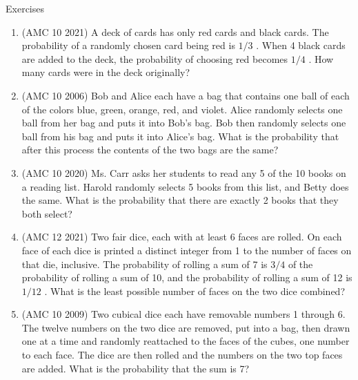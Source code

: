 \begin{xcb}{Exercises}
\begin{enumerate}
\begin{hint}
\end{hint}
\item(AMC 10 2021)  A deck of cards has only red cards and black cards. The probability of a randomly chosen card being red is $1/3$ . When 4 black cards are added to the deck, the probability of choosing red becomes $1/4$ . How many cards were in the deck originally?
\item(AMC 10 2006)  Bob and Alice each have a bag that contains one ball of each of the colors blue, green, orange, red, and violet. Alice randomly selects one ball from her bag and puts it into Bob’s bag. Bob then randomly selects one ball from his bag and puts it into Alice’s bag. What is the probability that after this process the contents of the two bags are the same?
\item(AMC 10 2020)  Ms. Carr asks her students to read any 5 of the 10 books on a reading list. Harold randomly selects 5 books from this list, and Betty does the same. What is the probability that there are exactly 2 books that they both select?
\begin{hint}
\end{hint}
\item (AMC 12 2021)  Two fair dice, each with at least 6 faces are rolled. On each face of each dice is printed a distinct integer from 1 to the number of faces on that die, inclusive. The probability of rolling a sum of 7 is $3/4$ of the probability of rolling a sum of 10, and the probability of rolling a sum of 12 is $1/12$ . What is the least possible number of faces on the two dice combined?
\begin{hint}
\end{hint}
\item (AMC 10 2009)  Two cubical dice each have removable numbers 1 through 6. The twelve numbers on the two dice are removed, put into a bag, then drawn one at a time and randomly reattached to the faces of the cubes, one number to each face. The dice are then rolled and the numbers on the two top faces are added. What is the probability that the sum is 7?

\end{enumerate}
\end{xcb}
